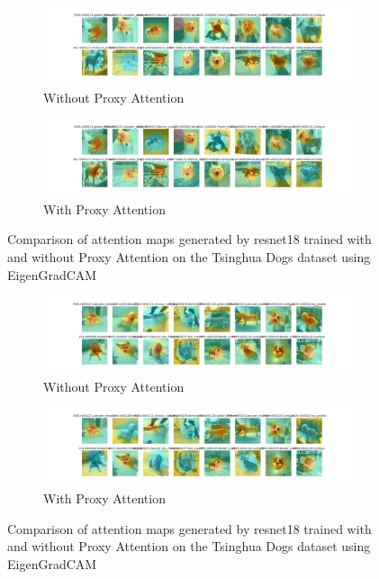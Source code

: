 \documentclass[a4paper,11pt,openright]{book}
\begin{document}
\begin{figure}[!htb]
    \centering
    \begin{subfigure}[b]{1\textwidth}
        \includegraphics[width=\textwidth]{images/tsing_resnet18_noproxy_2.pdf}
        \caption{Without Proxy Attention}
    \end{subfigure}
    \hfill
    \begin{subfigure}[b]{1\textwidth}
        \includegraphics[width=\textwidth]{images/tsing_resnet18_proxy_2.pdf}
        \caption{With Proxy Attention}
    \end{subfigure}
    \caption{Comparison of attention maps generated by resnet18 trained with and without Proxy Attention on the Tsinghua Dogs dataset using EigenGradCAM}
\end{figure}


\begin{figure}[!htb]
    \centering
    \begin{subfigure}[b]{1\textwidth}
        \includegraphics[width=\textwidth]{images/tsing_resnet18_noproxy_3.pdf}
        \caption{Without Proxy Attention}
    \end{subfigure}
    \hfill
    \begin{subfigure}[b]{1\textwidth}
        \includegraphics[width=\textwidth]{images/tsing_resnet18_proxy_3.pdf}
        \caption{With Proxy Attention}
    \end{subfigure}
    \caption{Comparison of attention maps generated by resnet18 trained with and without Proxy Attention on the Tsinghua Dogs dataset using EigenGradCAM}
\end{figure}
\end{document}
